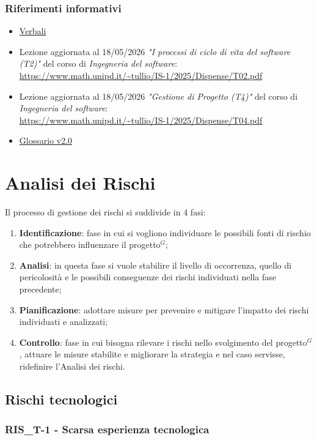 \documentclass[a4paper,10pt]{article}
\begin{document}
\subsubsection{Riferimenti informativi}
\begin{itemize}
  \item \href{https://tool-8.github.io/Documentazione-SWE/}{Verbali}
  \item Lezione aggiornata al 18/05/2026 \textit{"I processi di ciclo di vita del software (T2)"} del corso di \textit{Ingegneria del software}: \\ \url{https://www.math.unipd.it/~tullio/IS-1/2025/Dispense/T02.pdf}
  \item Lezione aggiornata al 18/05/2026 \textit{"Gestione di Progetto (T4)"} del corso di \textit{Ingegneria del software}: \\ \url{https://www.math.unipd.it/~tullio/IS-1/2025/Dispense/T04.pdf}
  \item \href{https://tool-8.github.io/Documentazione-SWE/glossario/Glossario.pdf}{Glossario v2.0}
\end{itemize}

\newpage

\section{Analisi dei Rischi}
Il processo di gestione dei rischi si suddivide in 4 fasi:
\begin{enumerate}
  \item \textbf{Identificazione}: fase in cui si vogliono individuare le possibili fonti di rischio che potrebbero influenzare il progetto$^G$;
  \item \textbf{Analisi}: in questa fase si vuole stabilire il livello di occorrenza, quello di pericolosità e le possibili conseguenze dei rischi individuati nella fase precedente;
  \item \textbf{Pianificazione}: adottare misure per prevenire e mitigare l'impatto dei rischi individuati e analizzati;
  \item \textbf{Controllo}: fase in cui bisogna rilevare i rischi nello svolgimento del progetto$^G$, attuare le misure stabilite e migliorare la strategia e nel caso servisse, ridefinire l'Analisi dei rischi.
\end{enumerate}
\subsection{Rischi tecnologici}
\subsubsection{RIS\_T-1 - Scarsa esperienza tecnologica}
\end{document}
